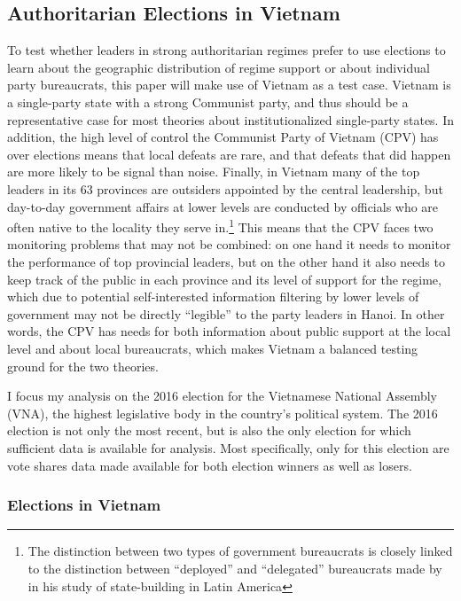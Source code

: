 \documentclass[12pt]{article}\usepackage[]{graphicx}\usepackage[]{color}
\newcommand{\1}{\mathbbm{1}}
\begin{document}
\subsection{Authoritarian Elections in Vietnam}
\label{sec:vietnam}
To test whether leaders in strong authoritarian regimes prefer to use elections to learn about the geographic distribution of regime support or about individual party bureaucrats, this paper will make use of Vietnam as a test case. Vietnam is a single-party state with a strong Communist party, and thus should be a representative case for most theories about institutionalized single-party states. In addition, the high level of control the Communist Party of Vietnam (CPV) has over elections \citep{MaleskySchuler2011} means that local defeats are rare, and that defeats that did happen are more likely to be signal than noise. Finally, in Vietnam many of the top leaders in its 63 provinces are outsiders appointed by the central leadership, but day-to-day government affairs at lower levels are conducted by officials who are often native to the locality they serve in.\footnote{The distinction between two types of government bureaucrats is closely linked to the distinction between ``deployed'' and ``delegated'' bureaucrats made by \cite{Soifer2015} in his study of state-building in Latin America} This means that the CPV faces two monitoring problems that may not be combined: on one hand it needs to monitor the performance of top provincial leaders, but on the other hand it also needs to keep track of the public in each province and its level of support for the regime, which due to potential self-interested information filtering by lower levels of government may not be directly ``legible'' \cite[in the words of][]{Scott1998} to the party leaders in Hanoi. In other words, the CPV has needs for both information about public support at the local level and about local bureaucrats, which makes Vietnam a balanced testing ground for the two theories.

I focus my analysis on the 2016 election for the Vietnamese National Assembly (VNA), the highest legislative body in the country's political system. The 2016 election is not only the most recent, but is also the only election for which sufficient data is available for analysis. Most specifically, only for this election are vote shares data made available for both election winners as well as losers.

\subsubsection{Elections in Vietnam}
\end{document}
